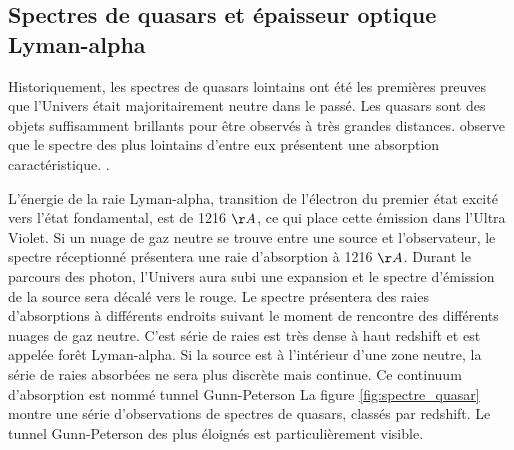 
\subsection{Spectres de quasars et épaisseur optique Lyman-alpha}

Historiquement, les spectres de quasars lointains ont été les premières preuves que l'Univers était majoritairement neutre dans le passé.
Les quasars sont des objets suffisamment brillants pour être observés à très grandes distances.
\cite{1965ApJ...141.1295S} observe que le spectre des plus lointains d'entre eux présentent une absorption caractéristique.
.%

L'énergie de la raie Lyman-alpha, transition de l'électron du premier état excité vers l’état fondamental, est de 1216 $\AA$, ce qui place cette émission dans l'Ultra Violet.
Si un nuage de gaz neutre se trouve entre une source et l'observateur, le spectre réceptionné présentera une raie d'absorption à 1216 $\AA$.
Durant le parcours des photon, l'Univers aura subi une expansion et le spectre d'émission de la source sera décalé vers le rouge.
Le spectre présentera des raies d’absorptions à différents endroits suivant le moment de rencontre des différents nuages de gaz neutre.
C'est série de raies est très dense à haut redshift et est appelée forêt Lyman-alpha.
Si la source est à l’intérieur d'une zone neutre, la série de raies absorbées ne sera plus discrète mais continue.
Ce continuum d’absorption est nommé tunnel Gunn-Peterson \citep{1965ApJ...141.1295S}
La figure \ref{fig:spectre_quasar} montre une série d'observations de spectres de quasars, classés par redshift.
Le tunnel Gunn-Peterson des plus éloignés est particulièrement visible.


